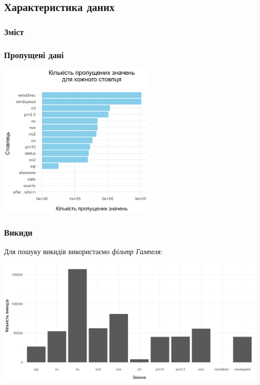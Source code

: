 \documentclass{beamer}
\begin{document}
\begin{frame}
  \section{Характеристика даних}

  \frametitle{Зміст}
  \tableofcontents[currentsection]
\end{frame}

\begin{frame}
  \frametitle{Пропущені дані}

  \begin{center}
    \includegraphics[height=3in]{plots/missed_data.png}
  \end{center}
\end{frame}

\begin{frame}
  \frametitle{Викиди}

  Для пошуку викидів використаємо \textit{фільтр Гампеля}:

  \includegraphics[width=\linewidth]{plots/outliers/count-bar.png}
\end{frame}
\end{document}
